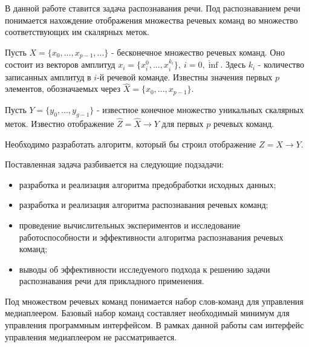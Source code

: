 В данной работе ставится задача распознавания речи. Под распознаванием речи понимается нахождение отображения множества речевых команд во множество соответствующих им скалярных меток. 

Пусть $X=\{x_0, ..., x_{p-1}, ...\}$ - бесконечное множество речевых команд. Оно состоит из векторов амплитуд $x_i=\{x_i^0, ..., x_i^{k_i}\},~i=\overline{0,\inf}$. Здесь $k_i$ - количество записанных амплитуд в $i$-й речевой команде. Известны значения первых $p$ элементов, обозначаемых через $\widehat{X}=\{x_0, ..., x_{p-1}\}$.  

Пусть $Y=\{y_0, ..., y_{g-1}\}$ - известное конечное множество уникальных скалярных меток. Известно отображение $\widehat{Z}=\widehat{X} \rightarrow Y$ для первых $p$ речевых команд.

Необходимо разработать алгоритм, который бы строил отображение $Z = X \rightarrow Y$.

Поставленная задача разбивается на следующие подзадачи:
\begin{itemize}[leftmargin=2cm]
	\item разработка и реализация алгоритма предобработки исходных данных;
	\item разработка и реализация алгоритма распознавания речевых команд;
	\item проведение вычислительных экспериментов и исследование работоспособности и эффективности алгоритма распознавания речевых команд;
	\item выводы об эффективности исследуемого подхода к решению задачи распознавания речи для прикладного применения.
\end{itemize}

Под множеством речевых команд понимается набор слов-команд для управления медиаплеером. Базовый набор команд составляет необходимый минимум для управления программным интерфейсом. В рамках данной работы сам интерфейс управления медиаплеером не рассматривается.